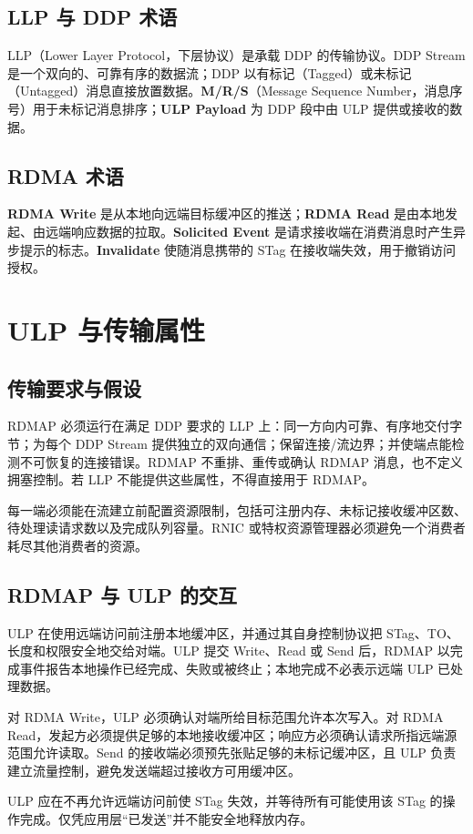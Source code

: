 \documentclass[11pt,a4paper]{article}
\newcommand{\term}[1]{\textbf{#1}}
\begin{document}
\subsection{LLP 与 DDP 术语}
LLP（Lower Layer Protocol，下层协议）是承载 DDP 的传输协议。DDP Stream 是一个双向的、可靠有序的数据流；DDP 以有标记（Tagged）或未标记（Untagged）消息直接放置数据。\term{M/R/S}（Message Sequence Number，消息序号）用于未标记消息排序；\term{ULP Payload} 为 DDP 段中由 ULP 提供或接收的数据。
\subsection{RDMA 术语}
\term{RDMA Write} 是从本地向远端目标缓冲区的推送；\term{RDMA Read} 是由本地发起、由远端响应数据的拉取。\term{Solicited Event} 是请求接收端在消费消息时产生异步提示的标志。\term{Invalidate} 使随消息携带的 STag 在接收端失效，用于撤销访问授权。
\section{ULP 与传输属性}
\subsection{传输要求与假设}
RDMAP 必须运行在满足 DDP 要求的 LLP 上：同一方向内可靠、有序地交付字节；为每个 DDP Stream 提供独立的双向通信；保留连接/流边界；并使端点能检测不可恢复的连接错误。RDMAP 不重排、重传或确认 RDMAP 消息，也不定义拥塞控制。若 LLP 不能提供这些属性，不得直接用于 RDMAP。

每一端必须能在流建立前配置资源限制，包括可注册内存、未标记接收缓冲区数、待处理读请求数以及完成队列容量。RNIC 或特权资源管理器必须避免一个消费者耗尽其他消费者的资源。
\subsection{RDMAP 与 ULP 的交互}
ULP 在使用远端访问前注册本地缓冲区，并通过其自身控制协议把 STag、TO、长度和权限安全地交给对端。ULP 提交 Write、Read 或 Send 后，RDMAP 以完成事件报告本地操作已经完成、失败或被终止；本地完成不必表示远端 ULP 已处理数据。

对 RDMA Write，ULP 必须确认对端所给目标范围允许本次写入。对 RDMA Read，发起方必须提供足够的本地接收缓冲区；响应方必须确认请求所指远端源范围允许读取。Send 的接收端必须预先张贴足够的未标记缓冲区，且 ULP 负责建立流量控制，避免发送端超过接收方可用缓冲区。

ULP 应在不再允许远端访问前使 STag 失效，并等待所有可能使用该 STag 的操作完成。仅凭应用层“已发送”并不能安全地释放内存。
\end{document}
